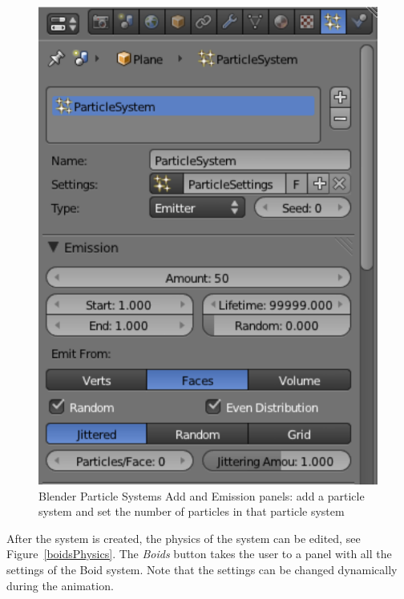 \begin{figure}[htbp]
\begin{center}
\includegraphics[scale= 0.65]{figures/boidsCreatePS.pdf} 
\caption{Blender Particle Systems Add and Emission panels: add a particle system and set the number of particles in that particle system}
\label{boidsCreatePS}
\end{center}
\end{figure}

After the system is created, the physics of the system can be edited, see Figure~\ref{boidsPhysics}. The \textit{Boids} button takes the user to a panel 
with all the settings of the Boid system.  Note that the 
settings can be changed dynamically during the animation. 


